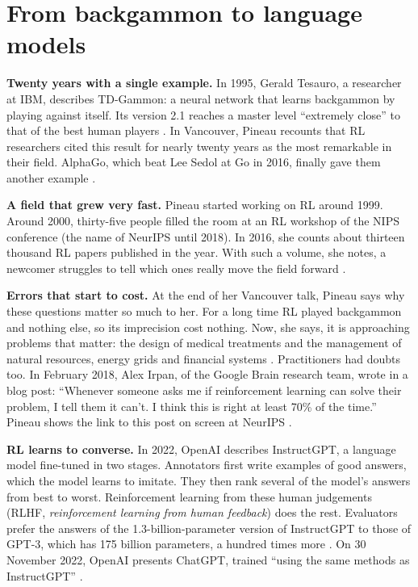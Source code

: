 \documentclass[11pt,a4paper]{article}
\begin{document}
\section{From backgammon to language
models}\label{from-backgammon-to-language-models}

\textbf{Twenty years with a single example.} In 1995, Gerald Tesauro, a
researcher at IBM, describes TD-Gammon: a neural network that learns
backgammon by playing against itself. Its version 2.1 reaches a master
level ``extremely close'' to that of the best human players
\autocite{tesauro1995tdgammon}. In Vancouver, Pineau recounts that RL
researchers cited this result for nearly twenty years as the most
remarkable in their field. AlphaGo, which beat Lee Sedol at Go in 2016,
finally gave them another example
\autocite{silver2016alphago,pineau2018iclr}.

\textbf{A field that grew very fast.} Pineau started working on RL
around 1999. Around 2000, thirty-five people filled the room at an RL
workshop of the NIPS conference (the name of NeurIPS until 2018). In
2016, she counts about thirteen thousand RL papers published in the
year. With such a volume, she notes, a newcomer struggles to tell which
ones really move the field forward \autocite{pineau2018iclr}.

\textbf{Errors that start to cost.} At the end of her Vancouver talk,
Pineau says why these questions matter so much to her. For a long time
RL played backgammon and nothing else, so its imprecision cost nothing.
Now, she says, it is approaching problems that matter: the design of
medical treatments and the management of natural resources, energy grids
and financial systems \autocite{pineau2018iclr}. Practitioners had
doubts too. In February 2018, Alex Irpan, of the Google Brain research
team, wrote in a blog post: ``Whenever someone asks me if reinforcement
learning can solve their problem, I tell them it can't. I think this is
right at least 70\% of the time.'' Pineau shows the link to this post on
screen at NeurIPS \autocite{irpan2018rlhard,pineau2018neurips}.

\textbf{RL learns to converse.} In 2022, OpenAI describes InstructGPT, a
language model fine-tuned in two stages. Annotators first write examples
of good answers, which the model learns to imitate. They then rank
several of the model's answers from best to worst. Reinforcement
learning from these human judgements (RLHF, \emph{reinforcement learning
from human feedback}) does the rest. Evaluators prefer the answers of
the 1.3-billion-parameter version of InstructGPT to those of GPT-3,
which has 175 billion parameters, a hundred times more
\autocite{ouyang2022instructgpt}. On 30 November 2022, OpenAI presents
ChatGPT, trained ``using the same methods as InstructGPT''
\autocite{openai2022chatgpt}.
\end{document}
